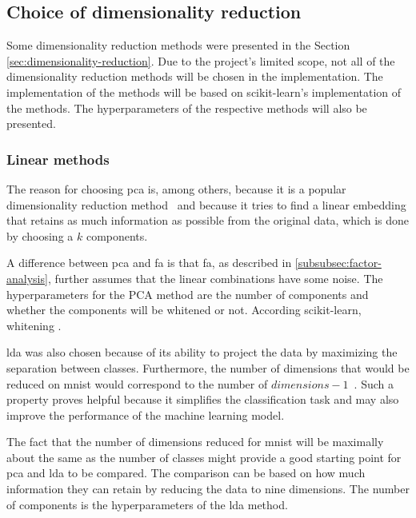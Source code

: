 \subsection{Choice of dimensionality reduction}\label{sec:choice-of-dimensionality-reduction}
Some dimensionality reduction methods were presented in the Section \ref{sec:dimensionality-reduction}. Due to the project's limited scope, not all of the dimensionality reduction methods will be chosen in the implementation. The implementation of the methods will be based on scikit-learn's implementation of the methods. The hyperparameters of the respective methods will also be presented.



\subsubsection{Linear methods}
The reason for choosing \gls{pca} is, among others, because it is a popular dimensionality reduction method~\cite{dimensionality-reduction-comparative-review} and because it tries to find a linear embedding that retains as much information as possible from the original data, which is done by choosing a $k$ components.

A difference between \gls{pca} and \gls{fa} is that \gls{fa}, as described in \ref{subsubsec:factor-analysis}, further assumes that the linear combinations have some noise. The hyperparameters for the PCA method are the number of components and whether the components will be whitened or not. According scikit-learn, whitening .


\gls{lda} was also chosen because of its ability to project the data by maximizing the separation between classes. Furthermore, the number of dimensions that would be reduced on \gls{mnist} would correspond to the number of $dimensions-1$~\cite{scikit-learn, sklearn-api}. Such a property proves helpful because it simplifies the classification task and may also improve the performance of the machine learning model.

The fact that the number of dimensions reduced for \gls{mnist} will be maximally about the same as the number of classes might provide a good starting point for \gls{pca} and \gls{lda} to be compared. The comparison can be based on how much information they can retain by reducing the data to nine dimensions. The number of components is the hyperparameters of the \gls{lda} method.


